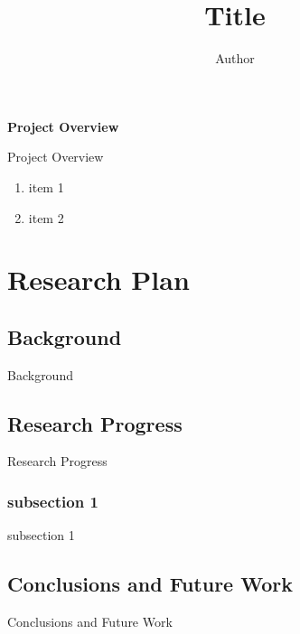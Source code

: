 \documentclass[12pt]{report}
\title{Title}
\author{Author}
\begin{document}
\begin{titlepage}
\cleardoublepage
\thispagestyle{empty}

\noindent
\textbf{Project Overview}

Project Overview
\begin{enumerate}
\item item 1
\item item 2
\end{enumerate}

\end{titlepage}

\cleardoublepage
\thispagestyle{empty}

\begingroup
\let\clearpage\relax
\tableofcontents
\endgroup

\cleardoublepage
\setcounter{chapter}{1}


\newpage
\chapter{Research Plan}
\section{Background}
Background
\section{Research Progress}
Research Progress
\subsection{subsection 1}
subsection 1
\section{Conclusions and Future Work}
Conclusions and Future Work
\newpage
{}


\end{document}
